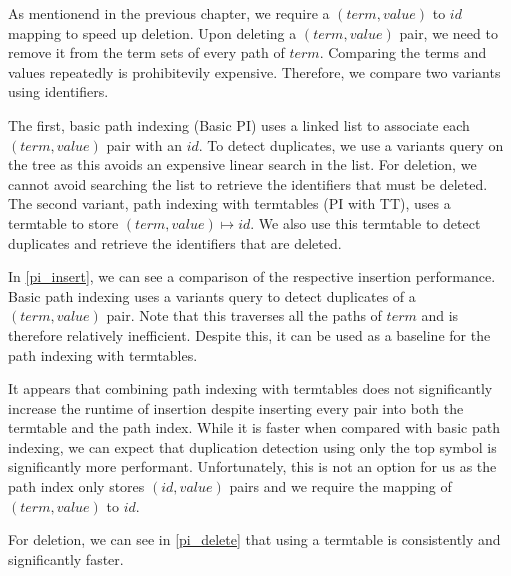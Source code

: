 As mentionend in the previous chapter, we require a $(term,value)$ to $id$ mapping to speed up deletion. Upon deleting a $(term,value)$ pair, we need to remove it from the term sets of every path of $term$. Comparing the terms and values repeatedly is prohibitevily expensive. Therefore, we compare two variants using identifiers.

The first, basic path indexing (Basic PI) uses a linked list to associate each $(term,value)$ pair with an $id$. To detect duplicates, we use a variants query on the tree as this avoids an expensive linear search in the list. For deletion, we cannot avoid searching the list to retrieve the identifiers that must be deleted. The second variant, path indexing with termtables (PI with TT), uses a termtable to store $(term,value) \mapsto id$. We also use this termtable to detect duplicates and retrieve the identifiers that are deleted.

In \cref{pi_insert}, we can see a comparison of the respective insertion performance. Basic path indexing uses a variants query to detect duplicates of a $(term,value)$ pair. Note that this traverses all the paths of $term$ and is therefore relatively inefficient. Despite this, it can be used as a baseline for the path indexing with termtables.

It appears that combining path indexing with termtables does not significantly increase the runtime of insertion despite inserting every pair into both the termtable and the path index. While it is faster when compared with basic path indexing, we can expect that duplication detection using only the top symbol is significantly more performant. Unfortunately, this is not an option for us as the path index only stores $(id,value)$ pairs and we require the mapping of $(term,value)$ to $id$.

For deletion, we can see in \cref{pi_delete} that using a termtable is consistently and significantly faster.

